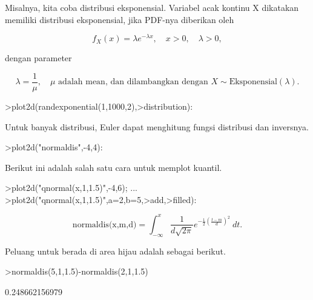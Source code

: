 \documentclass[a4paper,10pt]{article}
\begin{document}
\begin{eulernotebook}
\begin{eulercomment}
Misalnya, kita coba distribusi eksponensial. Variabel acak kontinu X
dikatakan memiliki distribusi eksponensial, jika PDF-nya diberikan
oleh\\
\end{eulercomment}
\begin{eulerformula}
\[
f_X(x)=\lambda e^{-\lambda x},\quad x>0,\quad \lambda>0,
\]
\end{eulerformula}
\begin{eulercomment}
dengan parameter\\
\end{eulercomment}
\begin{eulerformula}
\[
\lambda=\frac{1}{\mu},\quad \mu \text{ adalah mean, dan dilambangkan dengan } X \sim \text{Eksponensial}(\lambda).
\]
\end{eulerformula}
\begin{eulerprompt}
>plot2d(randexponential(1,1000,2),>distribution):
\end{eulerprompt}
\begin{eulercomment}
Untuk banyak distribusi, Euler dapat menghitung fungsi distribusi dan
inversnya.
\end{eulercomment}
\begin{eulerprompt}
>plot2d("normaldis",-4,4): 
\end{eulerprompt}
\begin{eulercomment}
Berikut ini adalah salah satu cara untuk memplot kuantil.
\end{eulercomment}
\begin{eulerprompt}
>plot2d("qnormal(x,1,1.5)",-4,6);  ...
>plot2d("qnormal(x,1,1.5)",a=2,b=5,>add,>filled):
\end{eulerprompt}
\begin{eulerformula}
\[
\text{normaldis(x,m,d)}=\int_{-\infty}^x \frac{1}{d\sqrt{2\pi}}e^{-\frac{1}{2}(\frac{t-m}{d})^2}\ dt.
\]
\end{eulerformula}
\begin{eulercomment}
Peluang untuk berada di area hijau adalah sebagai berikut.
\end{eulercomment}
\begin{eulerprompt}
>normaldis(5,1,1.5)-normaldis(2,1,1.5)
\end{eulerprompt}
\begin{euleroutput}
  0.248662156979
\end{euleroutput}
\begin{eulercomment}

\end{eulercomment}
\end{eulernotebook}
\end{document}
